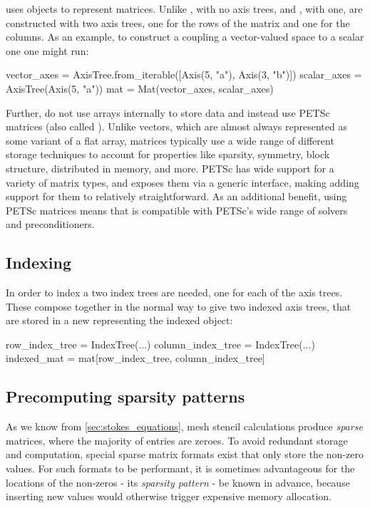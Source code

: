 \documentclass[thesis]{subfiles}
\begin{document}
 uses  objects to represent matrices.
Unlike , with no axis trees, and , with one,  are constructed with two axis trees, one for the rows of the matrix and one for the columns.
As an example, to construct a  coupling a vector-valued space to a scalar one one might run:
\begin{pyinline}
  vector_axes = AxisTree.from_iterable([Axis(5, "a"),
                                        Axis(3, "b")])
  scalar_axes = AxisTree(Axis(5, "a"))
  mat = Mat(vector_axes, scalar_axes)
\end{pyinline}

Further,  do not use \numpy{} arrays internally to store data and instead use PETSc matrices (also called ).
Unlike vectors, which are almost always represented as some variant of a flat array, matrices typically use a wide range of different storage techniques to account for properties like sparsity, symmetry, block structure, distributed in memory, and more.
PETSc has wide support for a variety of matrix types, and exposes them via a generic interface, making adding support for them to  relatively straightforward.
As an additional benefit, using PETSc matrices means that  is compatible with PETSc's wide range of solvers and preconditioners.

\subsection{Indexing}

In order to index a  two index trees are needed, one for each of the axis trees.
These compose together in the normal way to give two indexed axis trees, that are stored in a new  representing the indexed object:
\begin{pyinline}
  row_index_tree = IndexTree(...)
  column_index_tree = IndexTree(...)
  indexed_mat = mat[row_index_tree, column_index_tree]
\end{pyinline}

\subsection{Precomputing sparsity patterns}

As we know from \cref{sec:stokes_equations}, mesh stencil calculations produce \emph{sparse} matrices, where the majority of entries are zeroes.
To avoid redundant storage and computation, special sparse matrix formats exist that only store the non-zero values.
For such formats to be performant, it is sometimes advantageous for the locations of the non-zeros - its \emph{sparsity pattern} - be known in advance, because inserting new values would otherwise trigger expensive memory allocation.
\end{document}
